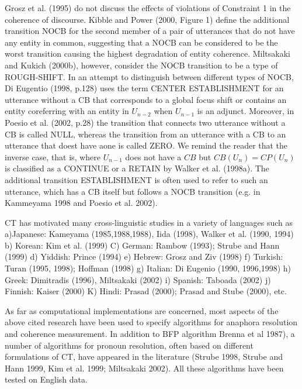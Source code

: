 Grosz et al. (1995) do not discuss the effects of violations of Constraint 1 in the coherence of discourse. 
Kibble and Power (2000, Figure 1) define the additional transition NOCB for the second member of a pair of utterances that do not have any entity in common, suggesting that a NOCB can be considered to be the worst transition causing the highest degradation of entity coherence. 
Miltsakaki and Kukich  (2000b), however, consider the NOCB transition to be a type of ROUGH-SHIFT.
In an attempt to distinguish between different types of NOCB, Di Eugentio (1998, p.128) uses the term CENTER ESTABLISHMENT for an utterance without a CB that corresponds to a global focus shift or contains an entity coreferring with an entity in $U_{n-2}$ when $U_{n-1}$ is an adjunct. 
Moreover, in Poesio et al. (2002, p.28) the transition that connects two utterance without a CB is called NULL, whereas the transition from an utterance with a CB to an utterance that doest have aone is called ZERO. 
We remind the reader that the inverse case, that is, where $U_{n-1}$ does not have a $CB$ but $CB(U_n)=CP(U_n)$ is classified as a CONTINUE or a RETAIN by Walker et al. (1998a). 
The additional transition ESTABLISHMENT is often used to refer to such an utterance, which has a CB itself but follows a NOCB transition (e.g. in Kammeyama 1998 and Poesio et al. 2002).

CT has motivated many cross-linguistic studies in a variety of languages such as a)Japanese: Kameyama (1985,1988,1988), Iida (1998), Walker et al. (1990, 1994) b) Korean: Kim et al. (1999) C) German: Rambow (1993); Strube and Hann (1999) d) Yiddish: Prince (1994) e) Hebrew: Grosz and Ziv (1998) f) Turkish: Turan (1995, 1998); Hoffman (1998) g) Italian: Di Eugenio (1990, 1996,1998) h) Greek: Dimitradis (1996), Miltsakaki (2002) i) Spanish: Taboada (2002) j) Finnish: Kaiser (2000) K) Hindi: Prasad (2000); Prasad and Stube (2000), etc. 

As far as computational implementations are concerned, most aspects of the above cited research have been used to specify algorithms for anaphora resolution and coherence measurement. In addition to BFP algorithm Brenna et al 1987), a number of algorithms for pronoun resolution, often based on different formulations of CT, have appeared in the literature (Strube 1998, Strube and Hann 1999, Kim et al. 1999; Miltsakaki 2002).
All these algorithms have been tested on English data.


